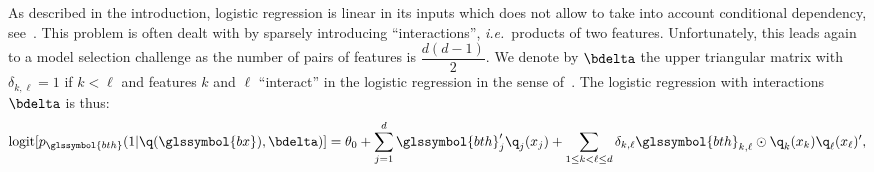 As described in the introduction, logistic regression is linear in its inputs which does not allow to take into account conditional dependency, see~\cite{berry2010testing}. This problem is often dealt with by sparsely introducing ``interactions'', \textit{i.e.}\ products of two features. Unfortunately, this leads again to a model selection challenge as the number of pairs of features is $\dfrac{d(d-1)}{2}$. We denote by $\bdelta$ the upper triangular matrix with $\delta_{k,\ell} = 1$ if $k < \ell$ and features $k$ and $\ell$ ``interact'' in the logistic regression in the sense of~\cite{berry2010testing}. The logistic regression with interactions $\bdelta$ is thus:
\begin{equation} \label{eq:reglog_sans}
\text{logit}[p_{\glssymbol{bth}}(1|\q(\glssymbol{bx}),\bdelta)] = \theta_{0} + \sum_{j=1}^d \glssymbol{bth}_j' \q_j(x_j) + \sum_{1 \leq k < \ell \leq d} \delta_{k,\ell} \glssymbol{bth}_{k,\ell} \odot \q_k(x_k) \q_\ell(x_\ell)',
\end{equation}
